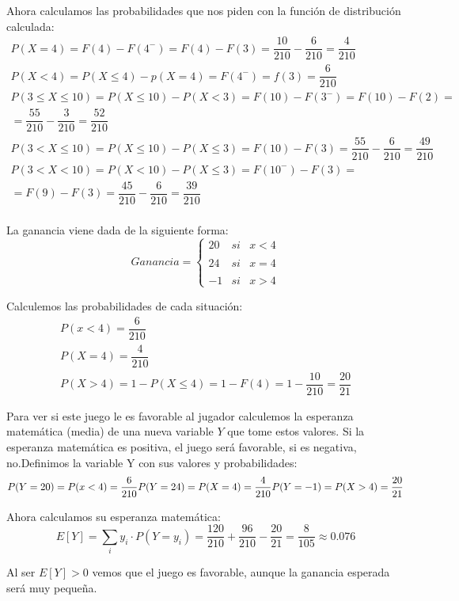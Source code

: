 Ahora calculamos las probabilidades que nos piden con la función de distribución calculada:
\begin{gather*}
    P(X = 4) = F(4) - F(4^-) = F(4) - F(3) = \dfrac{10}{210} - \dfrac{6}{210} = \dfrac{4}{210}\\
    P(X < 4) = P(X \leq 4) - p(X = 4) = F(4^-) = f(3) = \dfrac{6}{210}\\
    P(3 \leq X \leq 10) = P(X \leq 10) - P(X < 3) = F(10) - F(3^-) = F(10) - F(2) = \\ = \dfrac{55}{210} - \dfrac{3}{210} = \dfrac{52}{210}\\
    P(3 < X \leq 10) = P(X \leq 10) - P(X \leq 3) = F(10) - F(3) = \dfrac{55}{210} - \dfrac{6}{210} = \dfrac{49}{210}\\
    P(3 < X < 10) = P(X < 10) - P(X \leq 3) = F(10^-) - F(3) = \\ = F(9) - F(3) = \dfrac{45}{210} - \dfrac{6}{210} = \dfrac{39}{210}\\
\end{gather*}

\subproblem

La ganancia viene dada de la siguiente forma:
\begin{equation*}
    Ganancia = \left\{ \begin{array}{lcc}
             20 &   si  & x < 4 \\
             \\ 24 &  si & x = 4 \\
             \\ -1 &  si  & x > 4
             \end{array}
   \right.
\end{equation*}

Calculemos las probabilidades de cada situación:
\begin{gather*}
    P(x<4) = \dfrac{6}{210}\\
    P(X=4) = \dfrac{4}{210}\\
    P(X>4) = 1 - P(X \leq 4) = 1 - F(4) = 1 - \dfrac{10}{210} = \dfrac{20}{21}
\end{gather*}

Para ver si este juego le es favorable al jugador calculemos la esperanza matemática (media) de una nueva variable $Y$ que tome estos valores. Si la esperanza matemática es positiva, el juego será favorable, si es negativa, no.Definimos la variable Y con sus valores y probabilidades:
\begin{equation*}
    P(Y = 20) = P(x<4) = \dfrac{6}{210}\\
    P(Y = 24) = P(X=4) = \dfrac{4}{210}\\
    P(Y = -1) = P(X>4) = \dfrac{20}{21}
\end{equation*}

Ahora calculamos su esperanza matemática:
\begin{equation*}
    E[Y] = \sum_i y_i \cdot P(Y=y_i) = \dfrac{120}{210} + \dfrac{96}{210} - \dfrac{20}{21} = \dfrac{8}{105} \approx 0.076
\end{equation*}

Al ser $E[Y] > 0$ vemos que el juego es favorable, aunque la ganancia esperada será muy pequeña.
